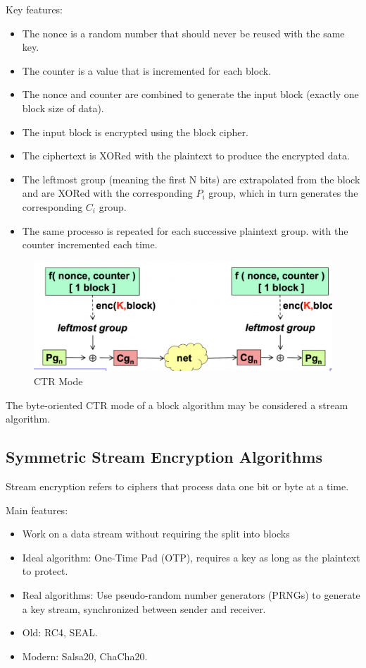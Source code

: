Key features:
\begin{itemize}
    \item The nonce is a random number that should never be reused with the same key.
    \item The counter is a value that is incremented for each block.
    \item The nonce and counter are combined to generate the input block (exactly one block size of data).
    \item The input block is encrypted using the block cipher.
    \item The ciphertext is XORed with the plaintext to produce the encrypted data.
    \item The leftmost group (meaning the first N bits) are extrapolated from the block and are XORed with the corresponding $P_i$ group, which in turn generates the corresponding $C_i$ group.
    \item The same processo is repeated for each successive plaintext group. with the counter incremented each time.
\end{itemize}

\begin{figure}[H]
    \centering
    \includegraphics[width=0.8\linewidth]{Images/Cryptography/CTR_ENC.png}
    \caption{CTR Mode}
\end{figure}

\begin{tcolorbox}[colback=blue!10!white, colframe=blue!50!white, title=CTR as a stream cipher]
The byte-oriented CTR mode of a block algorithm may be considered a stream algorithm.
\end{tcolorbox}

\subsection{Symmetric Stream Encryption Algorithms}
Stream encryption refers to ciphers that process data one bit or byte at a time.

Main features:
\begin{itemize}
    \item Work on a data stream without requiring the split into blocks
    \item Ideal algorithm: One-Time Pad (OTP), requires a key as long as the plaintext to protect.
    \item Real algorithms: Use pseudo-random number generators (PRNGs) to generate a key stream, synchronized between sender and receiver.
    \item Old: RC4, SEAL.
    \item Modern: Salsa20, ChaCha20.
\end{itemize}


